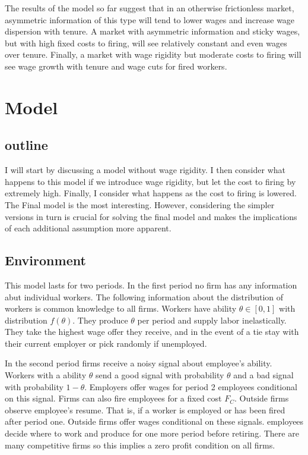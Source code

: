 \documentclass[11pt]{article}
\begin{document}
	The results of the model so far suggest that in an otherwise frictionless market, asymmetric information of this type will tend to lower wages and increase wage dispersion with tenure. A market with asymmetric information and sticky wages, but with high fixed costs to firing, will see relatively constant and even wages over tenure. Finally, a market with wage rigidity but moderate costs to firing will see wage growth with tenure and wage cuts for fired workers. 

	\section{Model}
	\subsection{outline}
	
	I will start by discussing a model without wage rigidity. I then consider what happens to this model if we introduce wage rigidity, but let the cost to firing by extremely high. Finally, I consider what happens as the cost to firing is lowered. The Final model is the most interesting. However, considering the simpler versions in turn is crucial for solving the final model and makes the implications of each additional assumption more apparent.  
	\subsection{Environment}
	
	This model lasts for two periods. In the first period no firm has any information abut individual workers. The following information about the distribution of workers is common knowledge to all firms. Workers have ability $\theta \in [0,1]$ with distribution $f(\theta)$. They produce $\theta$ per period and supply labor inelastically. They take the highest wage offer they receive, and in the event of a tie stay with their current employer or pick randomly if unemployed. \par
	
	In the second period firms receive a noisy signal about employee's ability. Workers with a ability $\theta$ send a good signal with probability $\theta$ and a bad signal with probability $1-\theta$. Employers offer wages for period 2 employees conditional on this signal. Firms can also fire employees for a fixed cost $F_C$. Outside firms observe employee's resume. That is, if a worker is employed or has been fired after period one. Outside firms offer wages conditional on these signals. employees decide where to work and produce for one more period before retiring. There are many competitive firms so this implies a zero profit condition on all firms. \par 
	
\end{document}
